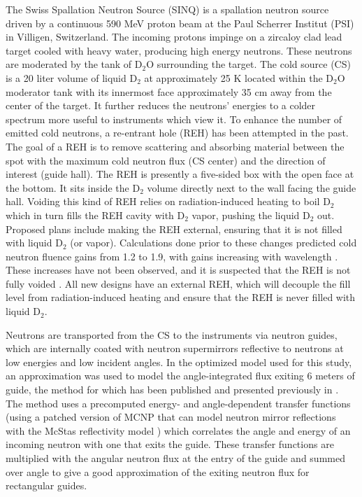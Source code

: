 \documentclass[a4paper]{jpconf}
\begin{document}
The Swiss Spallation Neutron Source (SINQ) is a spallation neutron source driven by a continuous 590 MeV proton beam at the Paul Scherrer Institut (PSI) in Villigen, Switzerland.  The incoming protons impinge on a zircaloy clad lead target cooled with heavy water, producing high energy neutrons.  These neutrons are moderated by the tank of D$_2$O surrounding the target.  The cold source (CS) is a 20 liter volume of liquid D$_2$ at approximately 25 K located within the D$_2$O moderator tank with its innermost face approximately 35 cm away from the center of the target.  It further reduces the neutrons' energies to a colder spectrum more useful to instruments which view it.  To enhance the number of emitted cold neutrons, a re-entrant hole (REH) has been attempted in the past.  The goal of a REH is to remove scattering and absorbing material between the spot with the maximum cold neutron flux (CS center) and the direction of interest (guide hall).  The REH is presently a five-sided box with the open face at the bottom.  It sits inside the D$_2$ volume directly next to the wall facing the guide hall.  Voiding this kind of REH relies on radiation-induced heating to boil D$_2$ which in turn fills the REH cavity with D$_2$ vapor, pushing the liquid D$_2$ out.  Proposed plans include making the REH external, ensuring that it is not filled with liquid D$_2$ (or vapor).  Calculations done prior to these changes predicted cold neutron fluence gains from 1.2 to 1.9, with gains increasing with wavelength \cite{atch_icans}. These increases have not been observed, and it is suspected that the REH is not fully voided \cite{voided}.  All new designs have an external REH, which will decouple the fill level from radiation-induced heating and ensure that the REH is never filled with liquid D$_2$.  

Neutrons are transported from the CS to the instruments via neutron guides, which are internally coated with neutron supermirrors reflective to neutrons at low energies and low incident angles.  In the optimized model used for this study, an approximation was used to model the angle-integrated flux exiting 6 meters of guide, the method for which has been published and presented previously in \cite{ecns}.  The method uses a precomputed energy- and angle-dependent transfer functions (using a patched version of MCNP that can model neutron mirror reflections with the McStas reflectivity model \cite{mcnpx-ref}) which correlates the angle and energy of an incoming neutron with one that exits the guide.  These transfer functions are multiplied with the angular neutron flux at the entry of the guide and summed over angle to give a good approximation of the exiting neutron flux for rectangular guides.    
\end{document}
